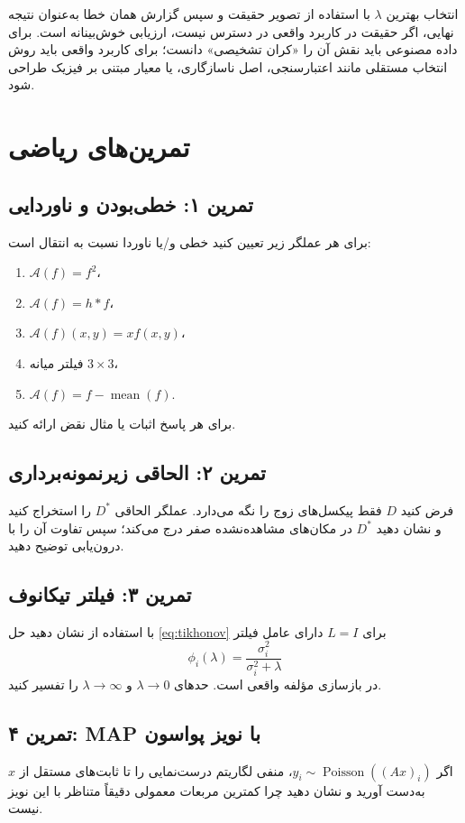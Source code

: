 \documentclass[12pt,openany,oneside]{book}
\newcommand{\op}[1]{\mathcal{#1}}
\begin{document}
\begin{warningbox}
انتخاب بهترین \(\lambda\) با استفاده از تصویر حقیقت و سپس گزارش همان خطا به‌عنوان نتیجه نهایی،
اگر حقیقت در کاربرد واقعی در دسترس نیست، ارزیابی خوش‌بینانه است. برای داده مصنوعی باید نقش آن را
«کران تشخیصی» دانست؛ برای کاربرد واقعی باید روش انتخاب مستقلی مانند اعتبارسنجی، اصل ناسازگاری،
 یا معیار مبتنی بر فیزیک طراحی شود.
\end{warningbox}

\section{تمرین‌های ریاضی}

\subsection*{تمرین ۱: خطی‌بودن و ناوردایی}
برای هر عملگر زیر تعیین کنید خطی و/یا ناوردا نسبت به انتقال است:
\begin{enumerate}
\item \(\op A(f)=f^2\)،
\item \(\op A(f)=h*f\)،
\item \(\op A(f)(x,y)=x f(x,y)\)،
\item فیلتر میانه \(3\times3\)،
\item \(\op A(f)=f-\operatorname{mean}(f)\).
\end{enumerate}
برای هر پاسخ اثبات یا مثال نقض ارائه کنید.

\subsection*{تمرین ۲: الحاقی زیرنمونه‌برداری}
فرض کنید \(D\) فقط پیکسل‌های زوج را نگه می‌دارد. عملگر الحاقی \(D^*\) را استخراج کنید و نشان دهید
\(D^*\) در مکان‌های مشاهده‌نشده صفر درج می‌کند؛ سپس تفاوت آن را با درون‌یابی توضیح دهید.

\subsection*{تمرین ۳: فیلتر تیکانوف}
با استفاده از  نشان دهید حل \eqref{eq:tikhonov} برای \(L=I\) دارای عامل فیلتر
\begin{equation}
\phi_i(\lambda)=\frac{\sigma_i^2}{\sigma_i^2+\lambda}
\end{equation}
در بازسازی مؤلفه واقعی است. حدهای \(\lambda\to0\) و \(\lambda\to\infty\) را تفسیر کنید.

\subsection*{تمرین ۴: MAP با نویز پواسون}
اگر \(y_i\sim\operatorname{Poisson}((Ax)_i)\)، منفی لگاریتم درست‌نمایی را تا ثابت‌های مستقل از \(x\)
به‌دست آورید و نشان دهید چرا کمترین مربعات معمولی دقیقاً متناظر با این نویز نیست.
\end{document}
